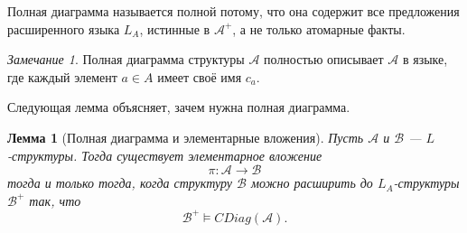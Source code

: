 \documentclass[12pt,a4paper,oneside,openany]{book}
\theoremstyle{definition}
\theoremstyle{plain}
\newtheorem{lemma}{Лемма}[chapter]
\theoremstyle{remark}
\newtheorem{remark}{Замечание}[chapter]
\begin{document}
Полная диаграмма называется полной потому, что она содержит все предложения расширенного языка $L_A$, истинные в $\mathcal A^+$, а не только атомарные факты.

\begin{remark}
Полная диаграмма структуры $\mathcal A$ полностью описывает $\mathcal A$ в языке, где каждый элемент $a\in A$ имеет своё имя $c_a$.
\end{remark}


Следующая лемма объясняет, зачем нужна полная диаграмма.

\begin{lemma}[Полная диаграмма и элементарные вложения]
Пусть $\mathcal A$ и $\mathcal B$ — $L$-структуры. Тогда существует элементарное вложение
\[
\pi:\mathcal A\to\mathcal B
\]
тогда и только тогда, когда структуру $\mathcal B$ можно расширить до $L_A$-структуры $\mathcal B^+$ так, что
\[
\mathcal B^+\models CDiag(\mathcal A).
\]
\end{lemma}
\end{document}
